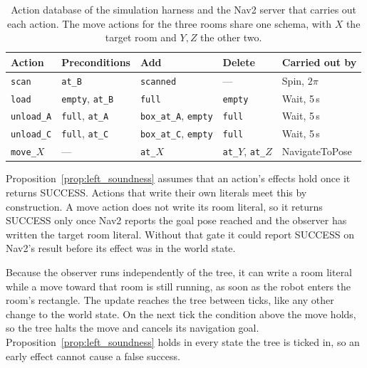     \begin{table}[htbp]
        \centering
        \caption[Action database of the simulation harness]{Action database of the simulation harness and the Nav2 server that carries out each action. The move actions for the three rooms share one schema, with $X$ the target room and $Y, Z$ the other two.}
        \label{tab:sim_actions}
        \begin{tabular}{@{}lllll@{}}
            \toprule
            Action & Preconditions & Add & Delete & Carried out by \\
            \midrule
            \texttt{scan}       & \texttt{at\_B}                 & \texttt{scanned}                  & ---            & Spin, $2\pi$ \\
            \texttt{load}       & \texttt{empty}, \texttt{at\_B} & \texttt{full}                     & \texttt{empty} & Wait, 5\,s \\
            \texttt{unload\_A}  & \texttt{full}, \texttt{at\_A}  & \texttt{box\_at\_A}, \texttt{empty} & \texttt{full}  & Wait, 5\,s \\
            \texttt{unload\_C}  & \texttt{full}, \texttt{at\_C}  & \texttt{box\_at\_C}, \texttt{empty} & \texttt{full}  & Wait, 5\,s \\
            \texttt{move\_$X$}  & ---                            & \texttt{at\_$X$}                  & \texttt{at\_$Y$}, \texttt{at\_$Z$} & NavigateToPose \\
            \bottomrule
        \end{tabular}
    \end{table}

    Proposition~\ref{prop:left_soundness} assumes that an action's effects hold once it returns SUCCESS.
    Actions that write their own literals meet this by construction.
    A move action does not write its room literal, so it returns SUCCESS only once Nav2 reports the goal pose reached and the observer has written the target room literal.
    Without that gate it could report SUCCESS on Nav2's result before its effect was in the world state.

    Because the observer runs independently of the tree, it can write a room literal while a move toward that room is still running, as soon as the robot enters the room's rectangle.
    The update reaches the tree between ticks, like any other change to the world state.
    On the next tick the condition above the move holds, so the tree halts the move and cancels its navigation goal.
    Proposition~\ref{prop:left_soundness} holds in every state the tree is ticked in, so an early effect cannot cause a false success.

